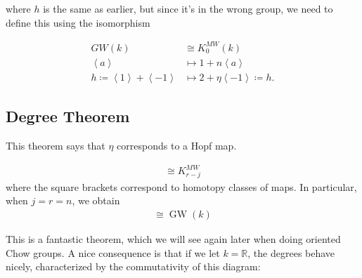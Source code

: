 where \(h\) is the same as earlier, but since it's in the wrong group,
we need to define this using the isomorphism

\begin{align*} G W ( k ) &\cong K _ { 0 } ^ { MW } ( k ) \\ \left\langle{a}\right\rangle &\mapsto 1 + n \left\langle{a}\right\rangle\\ h\coloneqq\left\langle{1}\right\rangle + \left\langle{-1}\right\rangle &\mapsto 2 + \eta\left\langle{-1}\right\rangle\coloneqq h. \end{align*}

\hypertarget{degree-theorem}{%
\subsection{Degree Theorem}\label{degree-theorem}}

This theorem says that \(\eta\) corresponds to a Hopf map.

\begin{theorem}[Morel]

\begin{align*}
[(S^1)^{\wedge n} \wedge ({\mathbb{G}}_m)^{\wedge j},~ (S^1)^{\wedge n} \wedge ({\mathbb{G}}_m)^{\wedge r}] \cong K^{MW}_{r-j}
\end{align*}
where the square brackets correspond to homotopy classes of maps. In
particular, when \(j=r=n\), we obtain
\begin{align*}
[{\mathbb{P}}^n /{\mathbb{P}}^{n-1},~ {\mathbb{P}}^n /{\mathbb{P}}^{n-1}] \cong {\operatorname{GW}}(k)
\end{align*}

\end{theorem}

This is a fantastic theorem, which we will see again later when doing
oriented Chow groups. A nice consequence is that if we let
\(k={\mathbb{R}}\), the degrees behave nicely, characterized by the
commutativity of this diagram:

\begin{center}
\end{center}

